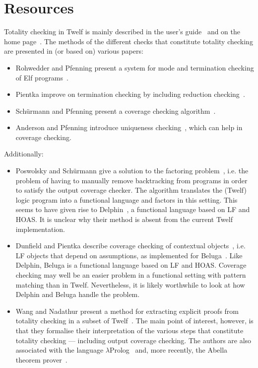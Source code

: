 \documentclass[12pt]{article}
\begin{document}
\section*{Resources}

Totality checking in Twelf is mainly described in the user's guide~\cite{Pfe98} and on the home page~\cite{Twelf16}.
The methods of the different checks that constitute totality checking are presented in (or based on) various papers:
\begin{itemize}
	\item Rohwedder and Pfenning present a system for mode and termination checking of Elf programs~\cite{RohPfe96}.
  \item Pientka improve on termination checking by including reduction checking~\cite{Pie01, Pie06}.
  \item Sch\"{u}rmann and Pfenning present a coverage checking algorithm~\cite{SchPfe03}.
  \item Anderson and Pfenning introduce uniqueness checking~\cite{AndPfe04}, which can help in coverage checking.
\end{itemize}

\noindent Additionally:
\begin{itemize}
	\item
Poswolsky and Sch\"{u}rmann give a solution to the factoring problem~\cite{PosSch03, PosSch03full, PosSch04}, i.e. the problem of having to manually remove backtracking from programs in order to satisfy the output coverage checker.
The algorithm translates the (Twelf) logic program into a functional language and factors in this setting.
This seems to have given rise to Delphin~\cite{PosSch09}, a functional language based on LF and HOAS.
It is unclear why their method is absent from the current Twelf implementation.
  \item
Dunfield and Pientka describe coverage checking of contextual objects~\cite{DunPie08, PieXX, PieDun10}, i.e. LF objects that depend on assumptions, as implemented for Beluga~\cite{PieDun10beluga}.
Like Delphin, Beluga is a functional language based on LF and HOAS.
Coverage checking may well be an easier problem in a functional setting with pattern matching than in Twelf.
Nevertheless, it is likely worthwhile to look at how Delphin and Beluga handle the problem.
  \item
Wang and Nadathur present a method for extracting explicit proofs from totality checking in a subset of Twelf~\cite{WanNad13}.
The main point of interest, however, is that they formalise their interpretation of the various steps that constitute totality checking --- including output coverage checking.
The authors are also associated with the language $\lambda$Prolog~\cite{NadMil88} and, more recently, the Abella theorem prover~\cite{Gac08}.
\end{itemize}



\end{document}
